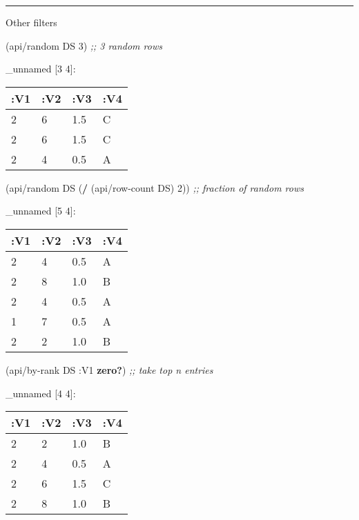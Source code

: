 \documentclass[]{article}
\newenvironment{Shaded}{\begin{snugshade}}{\end{snugshade}}
\newcommand{\AttributeTok}[1]{\textcolor[rgb]{0.77,0.63,0.00}{#1}}
\newcommand{\CommentTok}[1]{\textcolor[rgb]{0.56,0.35,0.01}{\textit{#1}}}
\newcommand{\DecValTok}[1]{\textcolor[rgb]{0.00,0.00,0.81}{#1}}
\newcommand{\KeywordTok}[1]{\textcolor[rgb]{0.13,0.29,0.53}{\textbf{#1}}}
\newcommand{\NormalTok}[1]{#1}
\begin{document}
\begin{center}\rule{0.5\linewidth}{0.5pt}\end{center}

Other filters

\begin{Shaded}
\begin{Highlighting}[]
\NormalTok{(api/random DS }\DecValTok{3}\NormalTok{) }\CommentTok{;; 3 random rows}
\end{Highlighting}
\end{Shaded}

\_unnamed {[}3 4{]}:

\begin{longtable}[]{@{}llll@{}}
\toprule
:V1 & :V2 & :V3 & :V4\tabularnewline
\midrule
\endhead
2 & 6 & 1.5 & C\tabularnewline
2 & 6 & 1.5 & C\tabularnewline
2 & 4 & 0.5 & A\tabularnewline
\bottomrule
\end{longtable}

\begin{Shaded}
\begin{Highlighting}[]
\NormalTok{(api/random DS (}\KeywordTok{/}\NormalTok{ (api/row-count DS) }\DecValTok{2}\NormalTok{)) }\CommentTok{;; fraction of random rows}
\end{Highlighting}
\end{Shaded}

\_unnamed {[}5 4{]}:

\begin{longtable}[]{@{}llll@{}}
\toprule
:V1 & :V2 & :V3 & :V4\tabularnewline
\midrule
\endhead
2 & 4 & 0.5 & A\tabularnewline
2 & 8 & 1.0 & B\tabularnewline
2 & 4 & 0.5 & A\tabularnewline
1 & 7 & 0.5 & A\tabularnewline
2 & 2 & 1.0 & B\tabularnewline
\bottomrule
\end{longtable}

\begin{Shaded}
\begin{Highlighting}[]
\NormalTok{(api/by-rank DS }\AttributeTok{:V1} \KeywordTok{zero?}\NormalTok{) }\CommentTok{;; take top n entries}
\end{Highlighting}
\end{Shaded}

\_unnamed {[}4 4{]}:

\begin{longtable}[]{@{}llll@{}}
\toprule
:V1 & :V2 & :V3 & :V4\tabularnewline
\midrule
\endhead
2 & 2 & 1.0 & B\tabularnewline
2 & 4 & 0.5 & A\tabularnewline
2 & 6 & 1.5 & C\tabularnewline
2 & 8 & 1.0 & B\tabularnewline
\bottomrule
\end{longtable}
\end{document}
